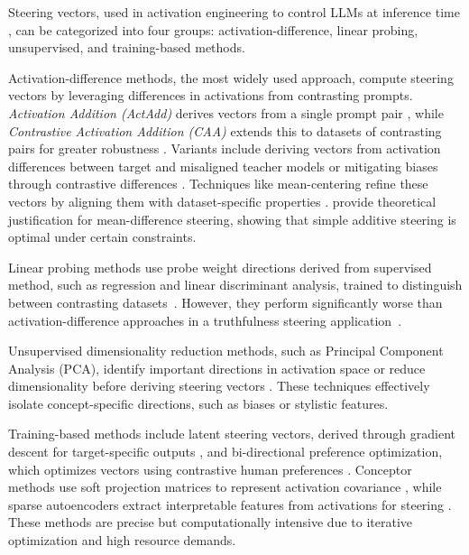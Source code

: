 Steering vectors, used in activation engineering to control LLMs at inference time \citep{li2024inference, zhao2024steering}, can be categorized into four groups: activation-difference, linear probing, unsupervised, and training-based methods.

Activation-difference methods, the most widely used approach, compute steering vectors by leveraging differences in activations from contrasting prompts. \textit{Activation Addition (ActAdd)} derives vectors from a single prompt pair \citep{turner2024steeringlanguagemodelsactivation}, while \textit{Contrastive Activation Addition (CAA)} extends this to datasets of contrasting pairs for greater robustness \citep{rimsky-etal-2024-steering}. Variants include deriving vectors from activation differences between target and misaligned teacher models \citep{wang2024trojan} or mitigating biases through contrastive differences \citep{chu2024causal, arditi2024refusal}. Techniques like mean-centering refine these vectors by aligning them with dataset-specific properties \citep{jorgensen2023improving, postmus2024steering, panickssery2023steering}. \citet{singhrepresentation} provide theoretical justification for mean-difference steering, showing that simple additive steering is optimal under certain constraints. 

Linear probing methods use probe weight directions derived from supervised method, such as regression and linear discriminant analysis, trained to distinguish between contrasting datasets~\citep{zhao2024steering, mallen2023eliciting, park2024the}. However, they perform significantly worse than activation-difference approaches in a truthfulness steering application~\citep{li2024inference}. 

Unsupervised dimensionality reduction methods, such as Principal Component Analysis (PCA), identify important directions in activation space or reduce dimensionality before deriving steering vectors \citep{zou2023transparency, liu2023context, adiladiscovering, wu2024reft, park2024the, burnsdiscovering}. These techniques effectively isolate concept-specific directions, such as biases or stylistic features.



Training-based methods include latent steering vectors, derived through gradient descent for target-specific outputs \citep{subramani2022extracting}, and bi-directional preference optimization, which optimizes vectors using contrastive human preferences \citep{cao2024personalized}. Conceptor methods use soft projection matrices to represent activation covariance \citep{postmus2024steering}, while sparse autoencoders extract interpretable features from activations for steering \citep{o2024steering, zhao2024steering}. These methods are precise but computationally intensive due to iterative optimization and high resource demands.

